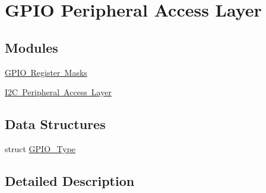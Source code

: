\hypertarget{group___g_p_i_o___peripheral___access___layer}{}\section{G\+P\+IO Peripheral Access Layer}
\label{group___g_p_i_o___peripheral___access___layer}
\subsection*{Modules}
\begin{DoxyCompactItemize}
\item 
\mbox{\hyperlink{group___g_p_i_o___register___masks}{G\+P\+I\+O Register Masks}}
\item 
\mbox{\hyperlink{group___i2_c___peripheral___access___layer}{I2\+C Peripheral Access Layer}}
\end{DoxyCompactItemize}
\subsection*{Data Structures}
\begin{DoxyCompactItemize}
\item 
struct \mbox{\hyperlink{struct_g_p_i_o___type}{G\+P\+I\+O\+\_\+\+Type}}
\end{DoxyCompactItemize}


\subsection{Detailed Description}
